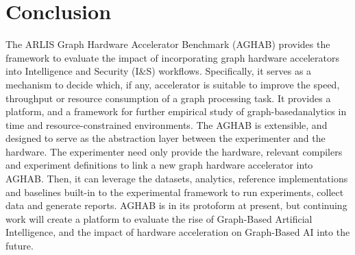 \section{Conclusion}\label{section:conclusion}
The ARLIS Graph Hardware Accelerator Benchmark (AGHAB) provides the framework to evaluate the impact of incorporating graph hardware accelerators into Intelligence and Security (I\&S) workflows. 
Specifically, it serves as a mechanism to decide which, if any, accelerator is suitable to improve the speed, throughput or resource consumption of a graph processing task.
It provides a platform, and a framework for further empirical study of graph-basedanalytics in time and resource-constrained environments. 
The AGHAB is extensible, and designed to serve as the abstraction layer between the experimenter and the hardware. 
The experimenter need only provide the hardware, relevant compilers and experiment definitions to link a new graph hardware accelerator into AGHAB.
Then, it can leverage the datasets, analytics, reference implementations and baselines built-in to the experimental framework to run experiments, collect data and generate reports. 
AGHAB is in its protoform at present, but continuing work will create a platform to evaluate the rise of Graph-Based Artificial Intelligence, and the impact of hardware acceleration on Graph-Based AI into the future. 